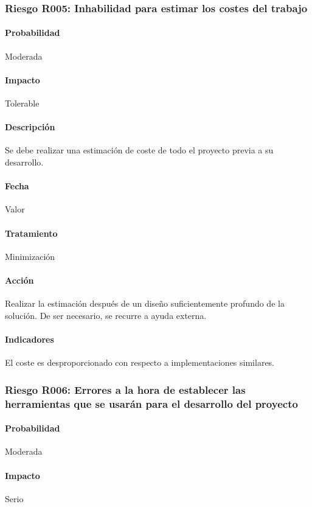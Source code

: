 \documentclass[10pt,a4paper]{article}
\begin{document}
				\subsubsection{Riesgo R005: Inhabilidad para estimar los costes del trabajo}
				\paragraph{Probabilidad} Moderada
				\paragraph{Impacto}	Tolerable
				\paragraph{Descripción} Se debe realizar una estimación de coste de todo el proyecto previa a su desarrollo.
				\paragraph{Fecha} Valor %
				\paragraph{Tratamiento} Minimización %
				\paragraph{Acción} Realizar la estimación después de un diseño suficientemente profundo de la solución. De ser necesario, se recurre a ayuda externa. %
				\paragraph{Indicadores} El coste es desproporcionado con respecto a implementaciones similares. %
				
				\subsubsection{Riesgo R006: Errores a la hora de establecer las herramientas que se usarán para el desarrollo del proyecto}
				\paragraph{Probabilidad} Moderada
				\paragraph{Impacto}	Serio
\end{document}
